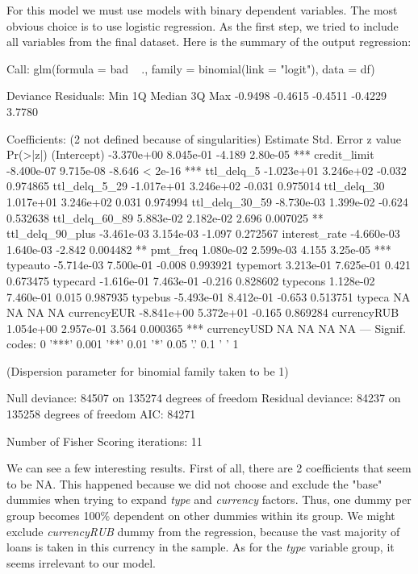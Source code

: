 \documentclass[12pt,a4paper]{article}
\begin{document}
For this model we must use models with binary dependent variables. The most obvious choice is to use logistic regression. As the first step, we tried to include all variables from the final dataset. Here is the summary of the output regression:
\begin{Schunk}
\begin{Soutput}
Call:
glm(formula = bad ~ ., family = binomial(link = "logit"), data = df)

Deviance Residuals: 
    Min       1Q   Median       3Q      Max  
-0.9498  -0.4615  -0.4511  -0.4229   3.7780  

Coefficients: (2 not defined because of singularities)
                   Estimate Std. Error z value Pr(>|z|)    
(Intercept)      -3.370e+00  8.045e-01  -4.189 2.80e-05 ***
credit_limit     -8.400e-07  9.715e-08  -8.646  < 2e-16 ***
ttl_delq_5       -1.023e+01  3.246e+02  -0.032 0.974865    
ttl_delq_5_29    -1.017e+01  3.246e+02  -0.031 0.975014    
ttl_delq_30       1.017e+01  3.246e+02   0.031 0.974994    
ttl_delq_30_59   -8.730e-03  1.399e-02  -0.624 0.532638    
ttl_delq_60_89    5.883e-02  2.182e-02   2.696 0.007025 ** 
ttl_delq_90_plus -3.461e-03  3.154e-03  -1.097 0.272567    
interest_rate    -4.660e-03  1.640e-03  -2.842 0.004482 ** 
pmt_freq          1.080e-02  2.599e-03   4.155 3.25e-05 ***
typeauto         -5.714e-03  7.500e-01  -0.008 0.993921    
typemort          3.213e-01  7.625e-01   0.421 0.673475    
typecard         -1.616e-01  7.463e-01  -0.216 0.828602    
typecons          1.128e-02  7.460e-01   0.015 0.987935    
typebus          -5.493e-01  8.412e-01  -0.653 0.513751    
typeca                   NA         NA      NA       NA    
currencyEUR      -8.841e+00  5.372e+01  -0.165 0.869284    
currencyRUB       1.054e+00  2.957e-01   3.564 0.000365 ***
currencyUSD              NA         NA      NA       NA    
---
Signif. codes:  0 '***' 0.001 '**' 0.01 '*' 0.05 '.' 0.1 ' ' 1

(Dispersion parameter for binomial family taken to be 1)

    Null deviance: 84507  on 135274  degrees of freedom
Residual deviance: 84237  on 135258  degrees of freedom
AIC: 84271

Number of Fisher Scoring iterations: 11
\end{Soutput}
\end{Schunk}
We can see a few interesting results. First of all, there are 2 coefficients that seem to be NA. This happened because we did not choose and exclude the "base" dummies when trying to expand \textit{type} and \textit{currency} factors. Thus, one dummy per group becomes 100\% dependent on other dummies within its group. We might exclude \textit{currencyRUB} dummy from the regression, because the vast majority of loans is taken in this currency in the sample. As for the \textit{type} variable group, it seems irrelevant to our model.
\end{document}
